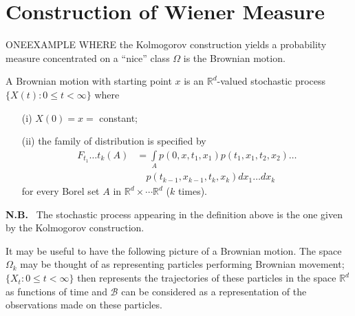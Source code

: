 \chapter{Construction of Wiener Measure}\label{chap4}

ONE\pageoriginale EXAMPLE WHERE the Kolmogorov construction yields a
probability measure concentrated on a ``nice'' class $\Omega$ is the
Brownian motion.

\begin{defi*}
A Brownian motion with starting point $x$ is an
$\mathbb{R}^{d}$-valued stochastic process $\{X(t):0\leq t<\infty\}$
where
\begin{itemize}
\item[(i)] $X(0)=x=$ constant;

\item[(ii)] the family of distribution is specified by
\begin{align*}
F_{t_{1}}\ldots
t_{k}(A) &=
\int\limits_{A}p(0,x,t_{1},x_{1})p(t_{1},x_{1},t_{2},x_{2})\ldots\\
&\quad 
p(t_{k-1},x_{k-1},t_{k},x_{k})dx_{1}\ldots dx_{k}
\end{align*}
for every Borel set $A$ in $\mathbb{R}^{d}\times\cdots\mathbb{R}^{d}$
($k$ times).
\end{itemize}
\end{defi*}

\noindent
{\bf N.B.}~ The stochastic process appearing in the definition above
is the one given by the Kolmogorov construction.

It may be useful to have the following picture of a Brownian
motion. The space $\Omega_{k}$ may be thought of as representing
particles performing Brownian movement; $\{X_{t}:0\leq t<\infty\}$
then represents the trajectories of these particles in the space
$\mathbb{R}^{d}$ as functions of time and $\mathscr{B}$ can be
considered as a representation of the observations made on these
particles.

